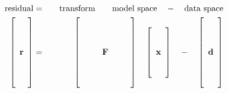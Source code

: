 \begin{eqnarray}
{\rm residual}
&=&
{\rm 
\quad \hbox{transform} \quad \quad \hbox{model space}
\quad - \quad
\hbox{data space}
}
        \\
\left[
\begin{array}{c}
	  \\
	  \\
	  \\
	 \bold r \\
	  \\
	  \\
	 \  
\end{array}
\right]
       &=&
\left[
  \begin{array}{ccc}
     \quad & \quad   &  \quad \\
     \quad & \quad   &  \quad \\
     \quad & \quad   &  \quad \\
     \quad & \bold F &  \quad \\
     \quad & \quad   &  \quad \\
     \quad & \quad   &  \quad \\
     \quad & \quad   &  \quad 
  \end{array}
\right]
          \quad
\left[
  \begin{array}{c}
	  \\
	  \\
	 \bold x \\
	  \\
	 \ 
  \end{array}
\right]
	\quad - \quad
\left[
  \begin{array}{c}
	  \\
	  \\
	  \\
	 \bold d \\
	  \\
	  \\
	 \ 
  \end{array}
\right]
\label{eqn:cg1b}
\end{eqnarray}


